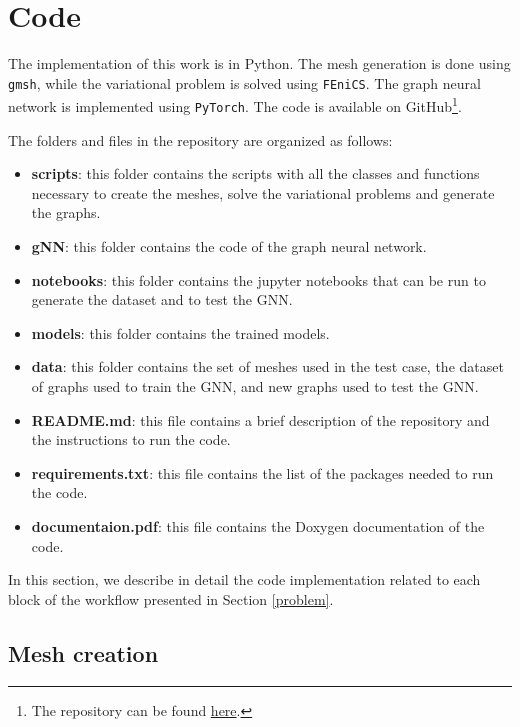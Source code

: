 \documentclass[11pt,a4paper]{article}
\begin{document}
\section{Code}

The implementation of this work is in Python. The mesh generation is done using \texttt{gmsh}, while the variational problem is solved using \texttt{FEniCS}. The graph neural network is implemented using \texttt{PyTorch}. The code is available on GitHub\footnote{The repository can be found \href{https://github.com/itsmebonny/pacsproj}{here}.}.

\noindent
The folders and files in the repository are organized as follows:
\medskip
\begin{itemize}
    \item[\faFolder] \textbf{scripts}: this folder contains the scripts with all the classes and functions necessary to create the meshes, solve the variational problems and generate the graphs. 
    \medskip
    \item[\faFolder] \textbf{gNN}: this folder contains the code of the graph neural network.
    \medskip
    \item[\faFolder] \textbf{notebooks}: this folder contains the jupyter notebooks that can be run to generate the dataset and to test the GNN.
    \medskip
    \item[\faFolder] \textbf{models}: this folder contains the trained models.
    \medskip
    \item[\faFolder] \textbf{data}: this folder contains the set of meshes used in the test case, the dataset of graphs used to train the GNN, and new graphs used to test the GNN.
    \medskip
    \item[\faFileO] \textbf{README.md}: this file contains a brief description of the repository and the instructions to run the code.
    \medskip
    \item[\faFileO] \textbf{requirements.txt}: this file contains the list of the packages needed to run the code.
    \medskip
    \item[\faFileO] \textbf{documentaion.pdf}: this file contains the Doxygen documentation of the code.
\end{itemize}

\medskip
\noindent
In this section, we describe in detail the code implementation related to each block of the workflow presented in Section \ref{problem}.

\subsection{Mesh creation}
\end{document}
